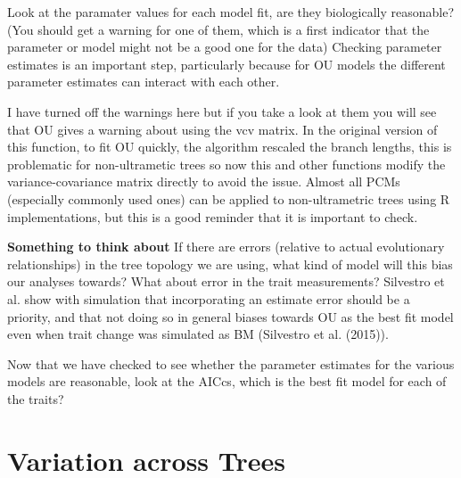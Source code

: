\documentclass[]{article}
\newenvironment{Shaded}{\begin{snugshade}}{\end{snugshade}}
\newcommand{\OperatorTok}[1]{\textcolor[rgb]{0.81,0.36,0.00}{\textbf{#1}}}
\newcommand{\NormalTok}[1]{#1}
\begin{document}
Look at the paramater values for each model fit, are they biologically
reasonable? (You should get a warning for one of them, which is a first
indicator that the parameter or model might not be a good one for the
data) Checking parameter estimates is an important step, particularly
because for OU models the different parameter estimates can interact
with each other.

I have turned off the warnings here but if you take a look at them you
will see that OU gives a warning about using the vcv matrix. In the
original version of this function, to fit OU quickly, the algorithm
rescaled the branch lengths, this is problematic for non-ultrametic
trees so now this and other functions modify the variance-covariance
matrix directly to avoid the issue. Almost all PCMs (especially commonly
used ones) can be applied to non-ultrametric trees using R
implementations, but this is a good reminder that it is important to
check.

\textbf{Something to think about} If there are errors (relative to
actual evolutionary relationships) in the tree topology we are using,
what kind of model will this bias our analyses towards? What about error
in the trait measurements? Silvestro et al. show with simulation that
incorporating an estimate error should be a priority, and that not doing
so in general biases towards OU as the best fit model even when trait
change was simulated as BM (Silvestro et al. (2015)).

Now that we have checked to see whether the parameter estimates for the
various models are reasonable, look at the AICcs, which is the best fit
model for each of the traits?

\begin{Shaded}
\end{Shaded}

\section{Variation across Trees}\label{variation-across-trees}
\end{document}
